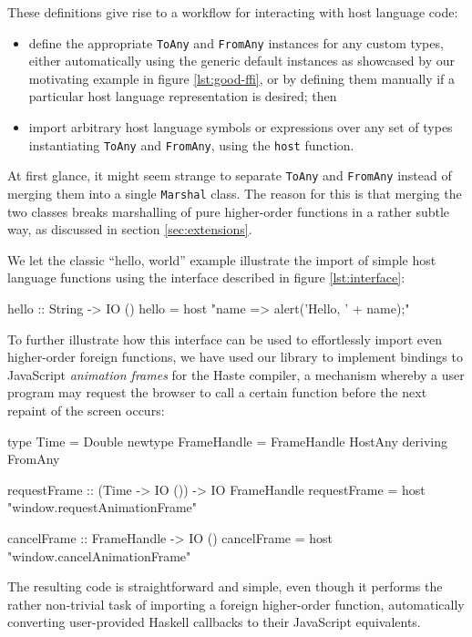\documentclass[preprint]{sigplanconf}
\begin{document}
These definitions give rise to a workflow for interacting with host
language code:
\begin{itemize}
\item
  define the appropriate \lstinline!ToAny! and \lstinline!FromAny! instances
  for any custom types, either automatically using the generic default instances
  as showcased by our motivating example in figure \ref{lst:good-ffi},
  or by defining them manually if a particular host language representation is
  desired; then
\item
  import arbitrary host language symbols or expressions over
  any set of types instantiating \lstinline!ToAny! and \lstinline!FromAny!,
  using the \lstinline!host! function.
\end{itemize}

At first glance, it might seem strange to separate \lstinline!ToAny!
and \lstinline!FromAny! instead of merging them into a single
\lstinline!Marshal! class. The reason for this is that merging the two classes
breaks marshalling of pure higher-order functions in a rather subtle way, as
discussed in section \ref{sec:extensions}.

We let the classic ``hello, world'' example illustrate the import of simple
host language functions using the interface described in figure
\ref{lst:interface}:

\begin{code}
hello :: String -> IO ()
hello = host "name => alert('Hello, ' + name);"
\end{code}

To further illustrate how this interface can be used to effortlessly import
even higher-order foreign functions, we have used our library to
implement bindings to JavaScript \emph{animation frames} for the Haste
compiler, a mechanism whereby a user program may request the browser to call
a certain function before the next repaint of the screen occurs:

\begin{code}
type Time = Double
newtype FrameHandle = FrameHandle HostAny
  deriving FromAny

requestFrame :: (Time -> IO ()) -> IO FrameHandle
requestFrame = host "window.requestAnimationFrame"

cancelFrame :: FrameHandle -> IO ()
cancelFrame = host "window.cancelAnimationFrame"
\end{code}

The resulting code is straightforward and simple, even though it performs
the rather non-trivial task of importing a foreign higher-order function,
automatically converting user-provided Haskell callbacks to their JavaScript
equivalents.
\end{document}
